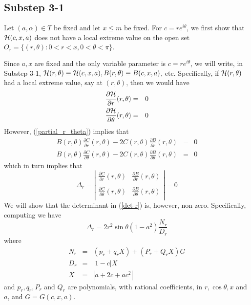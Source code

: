 \documentclass[12pt]{article}
\begin{document}
\subsection{Substep 3-1} 
Let $(a,\alpha) \in T$ be fixed and let $x \le m$ be fixed.  For $c = re^{i\theta}$, we first show that ${\cal H}(c,x,a)$ does not have a local extreme value on the open 
set $O_r = \{(r,\theta) : 0 < r < x, 0 < \theta < \pi \}$.  

Since $a, x$ are fixed and the only variable parameter is $c = re^{i\theta}$, we will write, in Substep 3-1, ${\cal H}(r,\theta) \equiv {\cal H}(c,x,a), {B}(r,\theta) \equiv {B}(c,x,a)$, etc. Specifically, if ${\cal H}(r,\theta)$ had a local extreme value, say at $(r,\theta)$, then
we would have 
\begin{eqnarray} \label{partial_r_theta}
\frac{\partial {\cal H}}{\partial r}{(r,\theta)} &=& 0 \\ \nonumber
\frac{\partial {\cal H}}{\partial \theta}{(r,\theta)} &=& 0
\end{eqnarray}
However, (\ref{partial_r_theta}) implies that 
\begin{eqnarray*} 
B(r,\theta)\frac{\partial {C}}{\partial r}{(r,\theta)} - 2C(r,\theta)\frac{\partial {B}}{\partial r}{(r,\theta)}&=& 0 \\ \nonumber
B(r,\theta)\frac{\partial {C}}{\partial \theta}{(r,\theta)} - 2C(r,\theta)\frac{\partial {B}}{\partial \theta}{(r,\theta)}&=& 0 
\end{eqnarray*}
which in turn implies that 
\begin{equation} \label{det-r}
\Delta_r = \left |
\begin{array}{ll}
\frac{\partial {C}}{\partial r}{(r,\theta)} & \frac{\partial {B}}{\partial r}{(r,\theta)} \\
& \\
\frac{\partial {C}}{\partial \theta}{(r,\theta)} & \frac{\partial {B}}{\partial \theta}{(r,\theta)} \\
\end{array}
\right | = 0
\end{equation}
We will show that the determinant in (\ref{det-r}) is, however, non-zero.  Specifically, computing we have
$$
\Delta_r = 2 r^2 \sin \theta (1-a^2) \frac{N_r}{D_r} 
$$
where
\begin{eqnarray*}
N_r &=& (p_r + q_r X) + (P_r + Q_r X)G \\
D_r &=& |1-c| X \\
X   &=& |a + 2c + ac^2|
\end{eqnarray*}
and $p_r, q_r, P_r$ and $Q_r$ are polynomials, with rational coefficients, in $r, \cos \theta, x$ and $a$, and $G = G(c,x,a)$.
\end{document}
